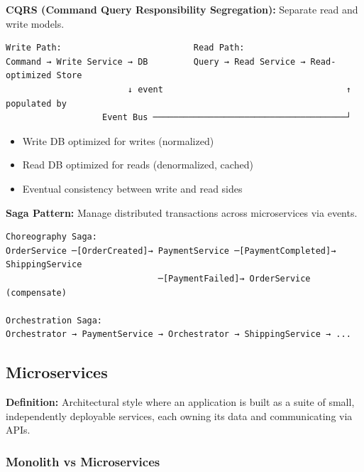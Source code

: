 \documentclass[11pt]{article}
\providecommand{\tightlist}{\setlength{\itemsep}{1pt}\setlength{\parskip}{0pt}}
\begin{document}
\textbf{CQRS (Command Query Responsibility Segregation):} Separate read and write models.

\setcodelang{}

\begin{verbatim}
Write Path:                          Read Path:
Command → Write Service → DB         Query → Read Service → Read-optimized Store
                        ↓ event                                    ↑ populated by
                   Event Bus ──────────────────────────────────────┘
\end{verbatim}

\begin{itemize}
\tightlist
\item
  Write DB optimized for writes (normalized)
\item
  Read DB optimized for reads (denormalized, cached)
\item
  Eventual consistency between write and read sides
\end{itemize}

\textbf{Saga Pattern:} Manage distributed transactions across microservices via events.

\setcodelang{}

\begin{verbatim}
Choreography Saga:
OrderService ─[OrderCreated]→ PaymentService ─[PaymentCompleted]→ ShippingService
                              ─[PaymentFailed]→ OrderService (compensate)

Orchestration Saga:
Orchestrator → PaymentService → Orchestrator → ShippingService → ...
\end{verbatim}

\subsection{Microservices}\label{microservices}

\textbf{Definition:} Architectural style where an application is built as a suite of small, independently deployable services, each owning its data and communicating via APIs.

\subsubsection{Monolith vs Microservices}\label{monolith-vs-microservices}
\end{document}
